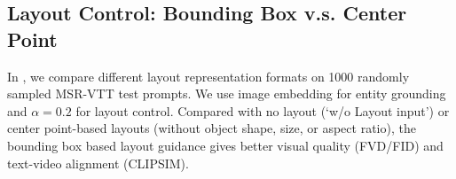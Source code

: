 \begin{table}[h]
    \centering
    \caption{Ablation of entity grounding embeddings of our \videomodule{} on MSR-VTT and Coref-SV.
    }
    \label{table:ablation_grounding_token}
\vspace{-3pt}
\end{table}
\normalsize 





\subsection{Layout Control: Bounding Box v.s. Center Point}
In ,
we compare different layout representation formats on 1000 randomly sampled MSR-VTT test prompts.
We use image embedding for entity grounding and $\alpha=0.2$ for layout control.
Compared with no layout (`w/o Layout input') or center point-based layouts (without object shape, size, or aspect ratio),
the bounding box based layout guidance gives better visual quality (FVD/FID) and text-video alignment (CLIPSIM).
















